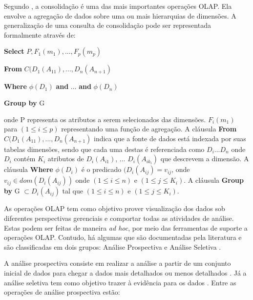 {Segundo , a consolidação é uma das mais importantes operações OLAP. Ela envolve a agregação de dados sobre uma ou mais hierarquias de dimensões. A generalização de uma consulta de consolidação pode ser representada formalmente através de: 

\textbf{Select} $\displaystyle P,F_{1}(m_1),..., F_p(m_p)$

\textbf{From} $\displaystyle C(D_1(A_{11}),...,D_n(A_{n+1})$

\textbf{Where} $\displaystyle \phi(D_1)$ \textbf{and} ... \textbf{and}  $\displaystyle\phi(D_n)$

\textbf{Group by} G

onde P representa os atributos a serem selecionados das dimensões. $\displaystyle F_{i}(m_1)$ para $\displaystyle (1 \leq i \leq p) $ representando uma função de agregação. A cláusula \textbf{From} $\displaystyle C(D_1(A_{11}),...,D_n(A_{n+1})$ indica que a fonte de dados está indexada por suas tabelas dimensões, sendo que cada uma destas é referenciada como $\displaystyle D_i ... D_n $ onde  $\displaystyle D_i $ contém  $\displaystyle K_i$ atributos de  $\displaystyle D_i(A_{i1})$, ... $ \displaystyle D_i(A_{ik_{i}}) $ que descrevem a dimensão.  A cláusula \textbf{Where} $\displaystyle \phi(D_i)$ é o predicado $\displaystyle (D_i(A_{ij}) = v_{ij}$, onde $\displaystyle v_{ij} \in dom(D_i(A_{ij}))$ onde $\displaystyle (1 \leq i \leq n) $ e $\displaystyle (1 \leq j \leq K_{i}) $. A cláusula \textbf{Group by} G $\displaystyle \subset {D_{i}(A_{ij})} $ tal que $\displaystyle (1 \leq i \leq n) $ e $\displaystyle (1 \leq j \leq K_{i})$.


As operações OLAP tem como objetivo prover visualização dos dados sob diferentes perspectivas gerenciais e comportar todas as atividades de análise. Estas podem ser feitas de maneira \textit{ad hoc}, por meio das ferramentas de suporte a operações OLAP. Contudo, há algumas que são documentadas pela literatura e são classificadas em dois grupos: Análise Prospectiva e Análise Seletiva .

A análise prospectiva consiste em realizar a análise a partir de um conjunto inicial de dados para chegar a dados mais detalhados ou menos detalhados \cite{Inmon1992}. Já a análise seletiva tem como objetivo trazer à evidência para os dados \cite{andre2000}. Entre as operações de análise prospectiva estão:

\begin{easylist}[itemize]


\end{easylist}}

